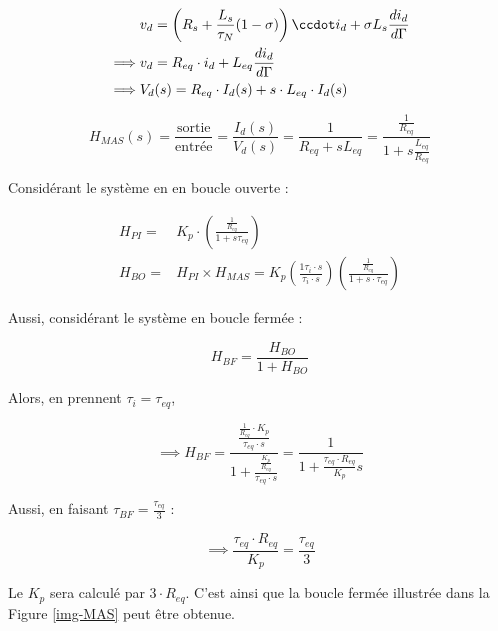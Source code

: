 \begin{align}
    &v_{d} = \left( R_s + \frac{L_s}{\tau_N} (1 - \sigma) \right) \ccdot i_{d} + \sigma L_s \frac{d i_d}{d\Gamma} \notag \\
    \implies &v_{d} = R_{eq} \cdot i_{d} + L_{eq} \frac{d i_{d}}{d \Gamma} \notag \\
    \implies &V_{d} (s) = R_{eq} \cdot I_{d} (s) + s \cdot L_{eq} \cdot I_{d} (s)
    \label{eq:PI_1}
\end{align}

\begin{equation}
    H_{MAS} (s) = \frac{\text{sortie}}{\text{entrée}} = \frac{I_{d}(s)}{V_{d}(s)} = \frac{1}{R_{eq} + s L_{eq}} = \frac{\frac{1}{R_{eq}}}{1 + s \frac{L_{eq}}{R_{eq}}}
    \label{eq:PI_2}
\end{equation}

\FloatBarrier
Considérant le système en en boucle ouverte :

\begin{align}
    H_{PI} =& K_p \cdot \left( \frac{\frac{1}{R_{eq}}}{1 + s \tau_{eq}} \right) \\
    H_{BO} =& H_{PI} \times H_{MAS} = K_p \left( \frac{1 \tau_i \cdot s}{\tau_i \cdot s} \right) \left( \frac{\frac{1}{R_{eq}}}{1 + s \cdot \tau_{eq}} \right)
\end{align}

Aussi, considérant le système en boucle fermée :

\begin{equation*}
    H_{BF} = \frac{H_{BO}}{1 + H_{BO}}
\end{equation*}

Alors, en prennent $\tau_i = \tau_{eq}$, 

\begin{equation*}
    \implies H_{BF} = \frac{\frac{\frac{1}{R_{eq}} \cdot K_p}{\tau_{eq} \cdot s}}   {1 + \frac{\frac{K_p}{R_{eq}}}{\tau_{eq} \cdot s}} = \frac{1}{1 + \frac{\tau_{eq} \cdot R_{eq}}{K_p}s}
\end{equation*}

Aussi, en faisant $\tau_{BF} = \frac{\tau_{eq}}{3}$ :

\begin{equation*}
    \implies \frac{\tau_{eq} \cdot R_{eq}}{K_p} = \frac{\tau_{eq}}{3}
\end{equation*}

Le $K_p$ sera calculé par $3 \cdot R_{eq}$. C'est ainsi que la boucle fermée illustrée dans la Figure \ref{img-MAS} peut être obtenue. 

